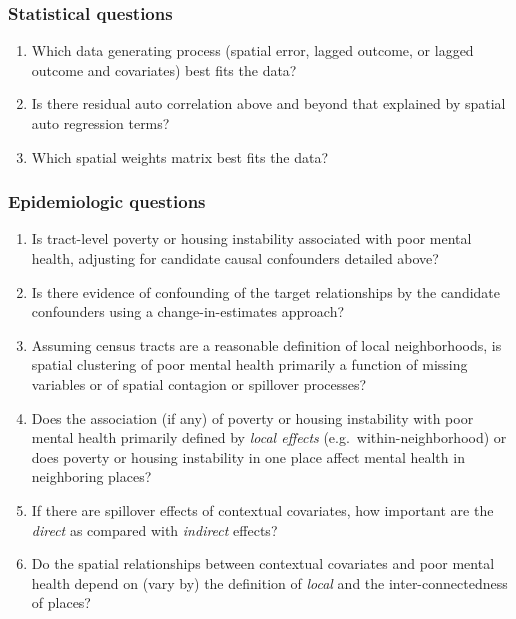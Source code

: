 \documentclass[
]{book}
\providecommand{\tightlist}{%
  \setlength{\itemsep}{0pt}\setlength{\parskip}{0pt}}
\begin{document}
\hypertarget{statistical-questions}{%
\subsubsection{Statistical questions}\label{statistical-questions}}

\begin{enumerate}
\def\labelenumi{\arabic{enumi}.}
\tightlist
\item
  Which data generating process (spatial error, lagged outcome, or lagged outcome and covariates) best fits the data?
\item
  Is there residual auto correlation above and beyond that explained by spatial auto regression terms?
\item
  Which spatial weights matrix best fits the data?
\end{enumerate}

\hypertarget{epidemiologic-questions}{%
\subsubsection{Epidemiologic questions}\label{epidemiologic-questions}}

\begin{enumerate}
\def\labelenumi{\arabic{enumi}.}
\tightlist
\item
  Is tract-level poverty or housing instability associated with poor mental health, adjusting for candidate causal confounders detailed above?
\item
  Is there evidence of confounding of the target relationships by the candidate confounders using a change-in-estimates approach?
\item
  Assuming census tracts are a reasonable definition of local neighborhoods, is spatial clustering of poor mental health primarily a function of missing variables or of spatial contagion or spillover processes?
\item
  Does the association (if any) of poverty or housing instability with poor mental health primarily defined by \emph{local effects} (e.g.~within-neighborhood) or does poverty or housing instability in one place affect mental health in neighboring places?
\item
  If there are spillover effects of contextual covariates, how important are the \emph{direct} as compared with \emph{indirect} effects?
\item
  Do the spatial relationships between contextual covariates and poor mental health depend on (vary by) the definition of \emph{local} and the inter-connectedness of places?
\end{enumerate}
\end{document}
